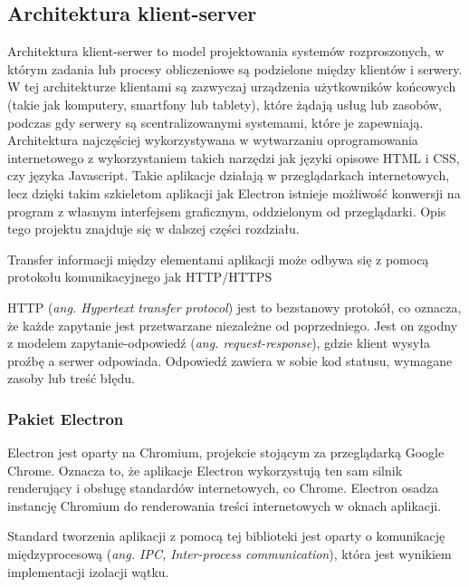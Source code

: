 \documentclass[12pt,a4paper,twoside]{article}
\begin{document}
\subsection{Architektura klient-server}
Architektura klient-serwer to model projektowania systemów rozproszonych, w którym zadania lub procesy obliczeniowe są podzielone między klientów i serwery. W tej architekturze klientami są zazwyczaj urządzenia użytkowników końcowych (takie jak komputery, smartfony lub tablety), które żądają usług lub zasobów, podczas gdy serwery są scentralizowanymi systemami, które je zapewniają. Architektura najczęściej wykorzystywana w wytwarzaniu oprogramowania internetowego z wykorzystaniem takich narzędzi jak języki opisowe HTML i CSS, czy języka Javascript. Takie aplikacje działają w przeglądarkach internetowych, lecz dzięki takim szkieletom aplikacji jak Electron istnieje możliwość konwersji na program z własnym interfejsem graficznym, oddzielonym od przeglądarki. Opis tego projektu znajduje się w dalszej części rozdziału.\par
Transfer informacji między elementami aplikacji może odbywa się z pomocą protokołu komunikacyjnego jak HTTP/HTTPS \par
HTTP (\textit{ang. Hypertext transfer protocol}) jest to bezstanowy protokół, co oznacza, że każde zapytanie jest przetwarzane niezależne od poprzedniego. Jest on zgodny z modelem zapytanie-odpowiedź (\textit{ang. request-response}), gdzie klient wysyła proźbę a serwer odpowiada. Odpowiedź zawiera w sobie kod statusu, wymagane zasoby lub treść błędu.\par
\subsubsection{Pakiet Electron}
Electron jest oparty na Chromium, projekcie stojącym za przeglądarką Google Chrome. Oznacza to, że aplikacje Electron wykorzystują ten sam silnik renderujący i obsługę standardów internetowych, co Chrome. Electron osadza instancję Chromium do renderowania treści internetowych w oknach aplikacji.\par
Standard tworzenia aplikacji z pomocą tej biblioteki jest oparty o komunikację międzyprocesową (\textit{ang. IPC, Inter-process communication}), która jest wynikiem implementacji izolacji wątku. 
\end{document}
